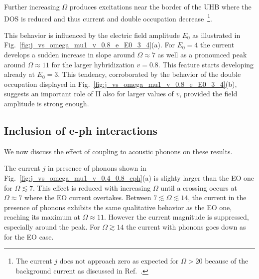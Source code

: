 \documentclass[aps,prb,groupedaddress,showpacs,twocolumn,superscriptaddress,10pt]{revtex4-2}
\begin{document}
Further increasing $\Omega$ produces excitations near the border of the UHB where the DOS is reduced and thus  current and double occupation decrease~\footnote{The current $j$ does not approach zero as expected for $\Omega>20$ because of the background current as discussed in Ref.~\cite{so.do.18}.}.

 
This behavior is influenced by the  electric field amplitude $E_0$  as illustrated in Fig.~\ref{fig:j_vs_omega_mu1_v_0.8_e_E0_3_4}(a). For $E_0=4$ the current develops a sudden increase in slope around $\Omega\approx7$ as well as a pronounced peak around $\Omega\approx 11$ for the larger hybridization $v=0.8$. This feature starts developing already at $E_0=3$. This tendency, corroborated by the behavior of the double occupation displayed in Fig.~\ref{fig:j_vs_omega_mu1_v_0.8_e_E0_3_4}(b), suggests an  important role of II also for larger values of $v$, provided the field amplitude is strong enough.

 
 
\subsection{Inclusion of e-ph interactions}
\label{sec:E0_2_electrons_phonons} 

We now discuss the effect of coupling to acoustic phonons on these results. 
  
The current $j$ in presence of phonons shown in Fig.~\ref{fig:j_vs_omega_mu1_v_0.4_0.8_eph}(a) is slighty larger than the EO one for $\Omega\lesssim7$. This effect is reduced with increasing $\Omega$ until a crossing occurs at $\Omega\approx7$ where the EO current overtakes. Between $7\lesssim\Omega\lesssim14$, the current in the presence of phonons exhibits the same qualitative behavior as the EO one, reaching its maximum at $\Omega\approx 11$. However the current magnitude is suppressed, especially around the peak. For $\Omega\gtrsim14$ the current with phonons goes down as for the EO case.
 
\end{document}
